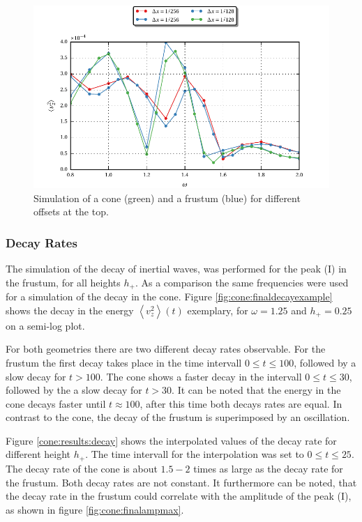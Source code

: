 {\begin{figure}[!b]

  \centering
  \includegraphics{gfx/cone/final/hd_comparison.pdf}
  \caption{
      \label{fig:cone:finalhdcomp}
    Simulation of a cone (green) and a frustum (blue) for different offsets at the
    top.
    }
\end{figure}
\clearpage

\subsubsection{Decay Rates}

The simulation of the decay of inertial waves, was performed for the peak (\RN{1}) in the frustum,
for all heights $h_+$.
As a comparison the same frequencies were used for a simulation of the decay in the cone.
Figure \ref{fig:cone:finaldecayexample} shows the decay in the energy  $\left<v_z^2\right>(t)$  exemplary,
for $\omega=1.25$ and $h_+=0.25$ on a semi-log plot.

For both geometries there are two different decay rates observable.
For the frustum the first decay takes place in the time intervall $0\leq t\leq 100$,
followed by a slow decay for $t>100$.
The cone shows a faster decay in the intervall $0\leq t\leq 30$, followed by the a slow decay for $t>30$.
It can be noted that the energy in the cone decays faster until $t\approx100$, after this time
both decays rates are  equal.  In contrast to the cone, the decay of the frustum  is superimposed by an oscillation.

Figure \ref{cone:results:decay} shows the interpolated values of the decay rate for different
height $h_+$.  The time intervall for the interpolation was set to $0 \leq t \leq 25$.
The decay rate of the cone is about $1.5-2$ times as large as the decay rate for the frustum.
Both decay rates are not constant.
It furthermore can be noted, that the decay rate in the frustum could correlate with
the amplitude of the peak (\RN{1}), as shown in figure \ref{fig:cone:finalampmax}.

}
